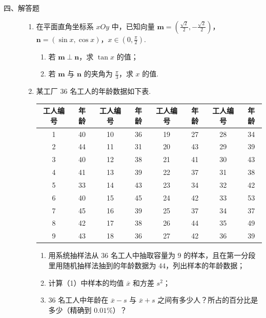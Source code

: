 \begin{description}

    \item[四、解答题]

    \begin{enumerate}[leftmargin=5pt]

      \addtocounter{enumi}{+15}

        \item 在平面直角坐标系 \(xOy\) 中，已知向量 \(\bm{m} = \left(\frac{\sqrt{2}}{2}, -\frac{\sqrt{2}}{2}\right)\)，\(\bm{n} = (\sin x, \cos x)\)，\(x \in \left(0, \frac{\pi}{2}\right)\).

\begin{enumerate}
\item 若 \(\bm{m} \perp \bm{n}\)，求 \(\tan x\) 的值；
\item 若 \(\bm{m}\) 与 \(\bm{n}\) 的夹角为 \(\frac{\pi}{3}\)，求 \(x\) 的值.
\end{enumerate}

        \item 某工厂 \(36\) 名工人的年龄数据如下表.

\begin{center}
\footnotesize
\renewcommand{\arraystretch}{1.15}
\begin{tabular}{|c|c|c|c|c|c|c|c|}
\hline
工人编号 & 年龄 & 工人编号 & 年龄 & 工人编号 & 年龄 & 工人编号 & 年龄 \\
\hline
1 & 40 & 10 & 36 & 19 & 27 & 28 & 34 \\
\hline
2 & 44 & 11 & 31 & 20 & 43 & 29 & 39 \\
\hline
3 & 40 & 12 & 38 & 21 & 41 & 30 & 43 \\
\hline
4 & 41 & 13 & 39 & 22 & 37 & 31 & 38 \\
\hline
5 & 33 & 14 & 43 & 23 & 34 & 32 & 42 \\
\hline
6 & 40 & 15 & 45 & 24 & 42 & 33 & 53 \\
\hline
7 & 45 & 16 & 39 & 25 & 37 & 34 & 37 \\
\hline
8 & 42 & 17 & 38 & 26 & 44 & 35 & 49 \\
\hline
9 & 43 & 18 & 36 & 27 & 42 & 36 & 39 \\
\hline
\end{tabular}
\end{center}

\begin{enumerate}
\item 用系统抽样法从 \(36\) 名工人中抽取容量为 \(9\) 的样本，且在第一分段里用随机抽样法抽到的年龄数据为 \(44\)，列出样本的年龄数据；
\item 计算（1）中样本的均值 \(\overline{x}\) 和方差 \(s^2\)；
\item \(36\) 名工人中年龄在 \(\overline{x} - s\) 与 \(\overline{x} + s\) 之间有多少人？所占的百分比是多少（精确到 \(0.01\%\)）？
\end{enumerate}


\end{enumerate}
\end{description}
